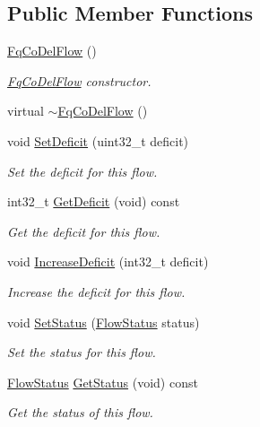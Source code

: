 \subsection*{Public Member Functions}
\begin{DoxyCompactItemize}
\item 
\hyperlink{classns3_1_1FqCoDelFlow_a0bab5a31819de6eab3f6d6d38a0a1203}{Fq\+Co\+Del\+Flow} ()
\begin{DoxyCompactList}\small\item\em \hyperlink{classns3_1_1FqCoDelFlow}{Fq\+Co\+Del\+Flow} constructor. \end{DoxyCompactList}\item 
virtual \hyperlink{classns3_1_1FqCoDelFlow_a3ab22eb07a38b6cabefa2c92b1dd1c56}{$\sim$\+Fq\+Co\+Del\+Flow} ()
\item 
void \hyperlink{classns3_1_1FqCoDelFlow_aad7f2bfdbf2a2f14639359b44afba1e3}{Set\+Deficit} (uint32\+\_\+t deficit)
\begin{DoxyCompactList}\small\item\em Set the deficit for this flow. \end{DoxyCompactList}\item 
int32\+\_\+t \hyperlink{classns3_1_1FqCoDelFlow_a86b77ca509d5b2b28b000877ba8f15ec}{Get\+Deficit} (void) const 
\begin{DoxyCompactList}\small\item\em Get the deficit for this flow. \end{DoxyCompactList}\item 
void \hyperlink{classns3_1_1FqCoDelFlow_adecd07134af4b47d62e6045c13a0d935}{Increase\+Deficit} (int32\+\_\+t deficit)
\begin{DoxyCompactList}\small\item\em Increase the deficit for this flow. \end{DoxyCompactList}\item 
void \hyperlink{classns3_1_1FqCoDelFlow_aecc704f3b5da4a2d2f0eda52e73cc55e}{Set\+Status} (\hyperlink{classns3_1_1FqCoDelFlow_afbdbeaa5fc8659ada26a5d7f0e277b39}{Flow\+Status} status)
\begin{DoxyCompactList}\small\item\em Set the status for this flow. \end{DoxyCompactList}\item 
\hyperlink{classns3_1_1FqCoDelFlow_afbdbeaa5fc8659ada26a5d7f0e277b39}{Flow\+Status} \hyperlink{classns3_1_1FqCoDelFlow_a5e9553b08f7786eb68385e2578c925a4}{Get\+Status} (void) const 
\begin{DoxyCompactList}\small\item\em Get the status of this flow. \end{DoxyCompactList}\end{DoxyCompactItemize}
